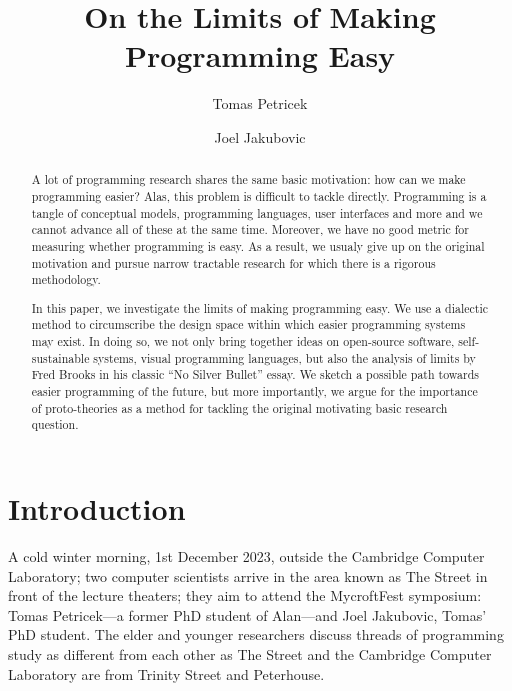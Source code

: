 \documentclass[runningheads]{llncs}
\begin{document}
\title{On the Limits of Making Programming Easy}

\author{Tomas Petricek \and
Joel Jakubovic}


\maketitle

\begin{abstract}
A lot of programming research shares the same basic motivation: how can we make programming easier? Alas, this problem is difficult to tackle directly. Programming is a tangle of conceptual models, programming languages, user interfaces and more and we cannot advance all of these at the same time. Moreover, we have no good metric for measuring whether programming is easy. As a result, we usualy give up on the original motivation and pursue narrow tractable research for which there is a rigorous methodology.

\qquad In this paper, we investigate the limits of making programming easy. We use a dialectic method to circumscribe the design space within which easier programming systems may exist. In doing so, we not only bring together ideas on open-source software, self-sustainable systems, visual programming languages, but also the analysis of limits by Fred Brooks in his classic ``No Silver Bullet'' essay. We sketch a possible path towards easier programming of the future, but more importantly, we argue for the importance of proto-theories as a method for tackling the original motivating basic research question.

\end{abstract}

\section{Introduction}
A cold winter morning, 1st December 2023, outside the Cambridge Computer Laboratory; two computer scientists arrive in the area known as The Street in front of the lecture theaters; they aim to attend the MycroftFest symposium: Tomas Petricek---a former PhD student of Alan---and Joel Jakubovic, Tomas’ PhD student. The elder and younger researchers discuss threads of programming study as different from each other as The Street and the Cambridge Computer Laboratory are from Trinity Street and Peterhouse.
\end{document}
